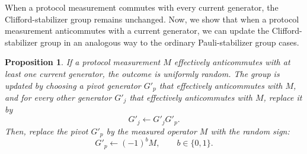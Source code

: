 \documentclass[
 reprint,
 amsmath,amssymb,
 pra,superscriptaddress, nofootinbib
]{revtex4-2}
\newtheorem{proposition}{Proposition}
\theoremstyle{definition}
\theoremstyle{plain}
\begin{document}
When a protocol measurement commutes with every current generator, the Clifford-stabilizer group remains unchanged. 
Now, we show that when a protocol measurement anticommutes with a current generator, we can update the Clifford-stabilizer group in an analogous way to the ordinary Pauli-stabilizer group cases.
\begin{proposition}
\label{prop:clifford_stabilizer_update}
If a protocol measurement $M$ effectively anticommutes with at least one current generator, the outcome is uniformly random. The group is updated by choosing a pivot generator $G'_p$ that effectively anticommutes with $M$, and for every other generator $G'_j$ that effectively anticommutes with $M$, replace it by
\begin{equation}
G'_j\leftarrow G'_jG'_p.
\label{eq:clifford_group_update_1}
\end{equation}
Then, replace the pivot $G'_p$ by the measured operator $M$ with the random sign:
\begin{equation}
G'_p\leftarrow (-1)^b M,
\qquad b\in\{0,1\}.
\label{eq:clifford_group_update_2}
\end{equation}
\end{proposition}
\end{document}
